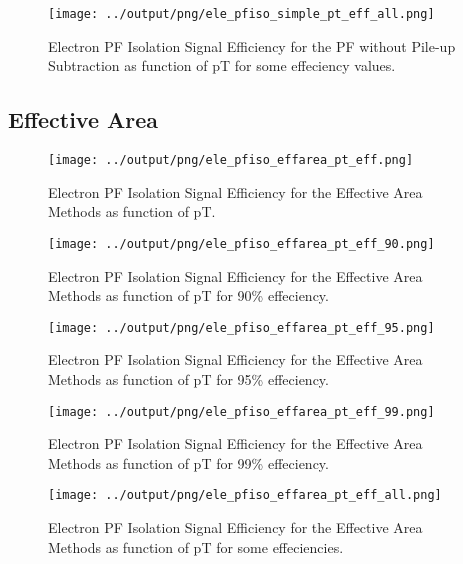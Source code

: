 \documentclass[11pt]{book}
\begin{document}
\begin{figure}[htb]
\centering
\texttt{[image: ../output/png/ele\_pfiso\_simple\_pt\_eff\_all.png]}
\caption{Electron PF Isolation Signal Efficiency for the PF without Pile-up Subtraction as function of pT for some effeciency values.}
\label{fig:ele_pfiso_pt_eff_simple_eff_all}
\end{figure}
\clearpage

\subsection{Effective Area}

\begin{figure}[htb]
\centering
\texttt{[image: ../output/png/ele\_pfiso\_effarea\_pt\_eff.png]}
\caption{Electron PF Isolation Signal Efficiency for the Effective Area Methods as function of pT.}
\label{fig:ele_pfiso_pt_eff_effarea}
\end{figure}

\begin{figure}[htb]
\centering
\texttt{[image: ../output/png/ele\_pfiso\_effarea\_pt\_eff\_90.png]}
\caption{Electron PF Isolation Signal Efficiency for the Effective Area Methods as function of pT for 90\% effeciency.}
\label{fig:ele_pfiso_pt_eff_effarea_eff_90}
\end{figure}

\begin{figure}[htb]
\centering
\texttt{[image: ../output/png/ele\_pfiso\_effarea\_pt\_eff\_95.png]}
\caption{Electron PF Isolation Signal Efficiency for the Effective Area Methods as function of pT for 95\% effeciency.}
\label{fig:ele_pfiso_pt_eff_effarea_eff_95}
\end{figure}

\begin{figure}[htb]
\centering
\texttt{[image: ../output/png/ele\_pfiso\_effarea\_pt\_eff\_99.png]}
\caption{Electron PF Isolation Signal Efficiency for the Effective Area Methods as function of pT for 99\% effeciency.}
\label{fig:ele_pfiso_pt_eff_effarea_eff_99}
\end{figure}

\begin{figure}[htb]
\centering
\texttt{[image: ../output/png/ele\_pfiso\_effarea\_pt\_eff\_all.png]}
\caption{Electron PF Isolation Signal Efficiency for the Effective Area Methods as function of pT for some effeciencies.}
\label{fig:ele_pfiso_pt_eff_effarea_eff_all}
\end{figure}
\clearpage
\end{document}
